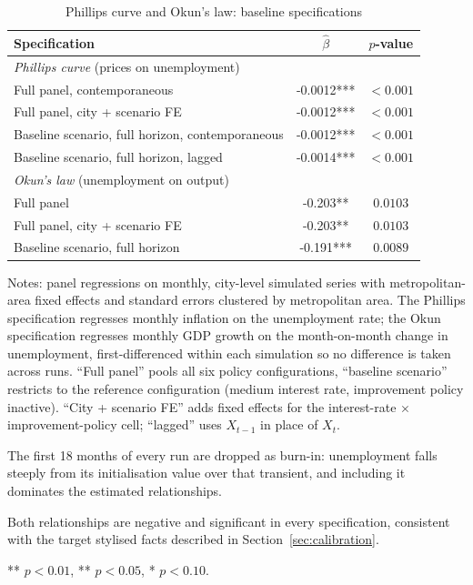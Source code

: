 \begin{table}[htbp]
\centering
\caption{Phillips curve and Okun's law: baseline specifications}
\label{tab:phillips_okun_main}
\begin{threeparttable}
\begin{tabular}{lcc}
\toprule
Specification & $\hat{\beta}$ & $p$-value \\
\midrule
\multicolumn{3}{l}{\textit{Phillips curve} (prices on unemployment)} \\[2pt]
Full panel, contemporaneous & -0.0012*** & $<0.001$ \\
Full panel, city + scenario FE & -0.0012*** & $<0.001$ \\
Baseline scenario, full horizon, contemporaneous & -0.0012*** & $<0.001$ \\
Baseline scenario, full horizon, lagged & -0.0014*** & $<0.001$ \\[4pt]
\multicolumn{3}{l}{\textit{Okun's law} (unemployment on output)} \\[2pt]
Full panel & -0.203** & $0.0103$ \\
Full panel, city + scenario FE & -0.203** & $0.0103$ \\
Baseline scenario, full horizon & -0.191*** & $0.0089$ \\
\bottomrule
\end{tabular}
\begin{tablenotes}
\footnotesize
\item Notes: panel regressions on monthly, city-level simulated series with metropolitan-area fixed effects and standard errors clustered by metropolitan area. The Phillips specification regresses monthly inflation on the unemployment rate; the Okun specification regresses monthly GDP growth on the month-on-month change in unemployment, first-differenced within each simulation so no difference is taken across runs. ``Full panel'' pools all six policy configurations, ``baseline scenario'' restricts to the reference configuration (medium interest rate, improvement policy inactive). ``City + scenario FE'' adds fixed effects for the interest-rate $\times$ improvement-policy cell; ``lagged'' uses $X_{t-1}$ in place of $X_{t}$.
\item The first 18 months of every run are dropped as burn-in: unemployment falls steeply from its initialisation value over that transient, and including it dominates the estimated relationships.
\item Both relationships are negative and significant in every specification, consistent with the target stylised facts described in Section~\ref{sec:calibration}.
\item *** $p<0.01$, ** $p<0.05$, * $p<0.10$.
\end{tablenotes}
\end{threeparttable}
\end{table}